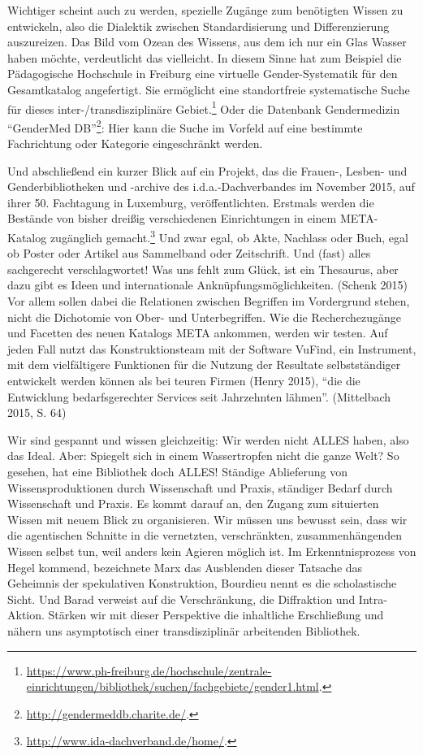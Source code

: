 Wichtiger scheint auch zu werden, spezielle Zugänge zum benötigten
Wissen zu entwickeln, also die Dialektik zwischen Standardisierung und
Differenzierung auszureizen. Das Bild vom Ozean des Wissens, aus dem ich
nur ein Glas Wasser haben möchte, verdeutlicht das vielleicht. In diesem
Sinne hat zum Beispiel die Pädagogische Hochschule in Freiburg eine
virtuelle Gender-Systematik für den Gesamtkatalog angefertigt. Sie
ermöglicht eine standortfreie systematische Suche für dieses
inter-/transdisziplinäre Gebiet.\footnote{\url{https://www.ph-freiburg.de/hochschule/zentrale-einrichtungen/bibliothek/suchen/fachgebiete/gender1.html}.}
Oder die Datenbank Gendermedizin \enquote{GenderMed DB}\footnote{\url{http://gendermeddb.charite.de/}.}:
Hier kann die Suche im Vorfeld auf eine bestimmte Fachrichtung oder
Kategorie eingeschränkt werden.

Und abschließend ein kurzer Blick auf ein Projekt, das die Frauen-,
Lesben- und Genderbibliotheken und -archive des i.d.a.-Dachverbandes im
November 2015, auf ihrer 50. Fachtagung in Luxemburg, veröffentlichten.
Erstmals werden die Bestände von bisher dreißig verschiedenen
Einrichtungen in einem META-Katalog zugänglich gemacht.\footnote{\url{http://www.ida-dachverband.de/home/}.}
Und zwar egal, ob Akte, Nachlass oder Buch, egal ob Poster oder Artikel
aus Sammelband oder Zeitschrift. Und (fast) alles sachgerecht
verschlagwortet! Was uns fehlt zum Glück, ist ein Thesaurus, aber dazu
gibt es Ideen und internationale Anknüpfungsmöglichkeiten. (Schenk 2015)
Vor allem sollen dabei die Relationen zwischen Begriffen im Vordergrund
stehen, nicht die Dichotomie von Ober- und Unterbegriffen. Wie die
Recherchezugänge und Facetten des neuen Katalogs META ankommen, werden
wir testen. Auf jeden Fall nutzt das Konstruktionsteam mit der Software
VuFind, ein Instrument, mit dem vielfältigere Funktionen für die Nutzung
der Resultate selbstständiger entwickelt werden können als bei teuren
Firmen (Henry 2015), \enquote{die die Entwicklung bedarfsgerechter
Services seit Jahrzehnten lähmen}. (Mittelbach 2015, S. 64)

Wir sind gespannt und wissen gleichzeitig: Wir werden nicht ALLES haben,
also das Ideal. Aber: Spiegelt sich in einem Wassertropfen nicht die
ganze Welt? So gesehen, hat eine Bibliothek doch ALLES! Ständige
Ablieferung von Wissensproduktionen durch Wissenschaft und Praxis,
ständiger Bedarf durch Wissenschaft und Praxis. Es kommt darauf an, den
Zugang zum situierten Wissen mit neuem Blick zu organisieren. Wir müssen
uns bewusst sein, dass wir die agentischen Schnitte in die vernetzten,
verschränkten, zusammenhängenden Wissen selbst tun, weil anders kein
Agieren möglich ist. Im Erkenntnisprozess von Hegel kommend, bezeichnete
Marx das Ausblenden dieser Tatsache das Geheimnis der spekulativen
Konstruktion, Bourdieu nennt es die scholastische Sicht. Und Barad
verweist auf die Verschränkung, die Diffraktion und Intra-Aktion.
Stärken wir mit dieser Perspektive die inhaltliche Erschließung und
nähern uns asymptotisch einer transdisziplinär arbeitenden Bibliothek.

